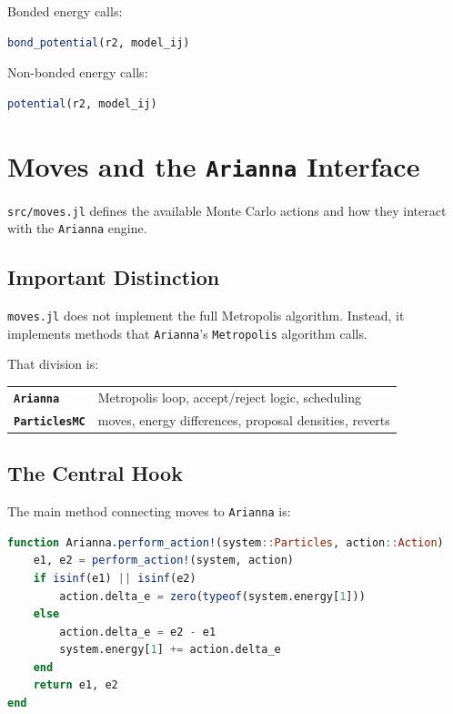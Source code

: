 \documentclass[11pt]{article}
\begin{document}
Bonded energy calls:

\begin{lstlisting}[language=Julia]
bond_potential(r2, model_ij)
\end{lstlisting}

Non-bonded energy calls:

\begin{lstlisting}[language=Julia]
potential(r2, model_ij)
\end{lstlisting}

\section{Moves and the \texttt{Arianna} Interface}

\texttt{src/moves.jl} defines the available Monte Carlo actions and how they
interact with the \texttt{Arianna} engine.

\subsection{Important Distinction}

\texttt{moves.jl} does not implement the full Metropolis algorithm. Instead, it
implements methods that \texttt{Arianna}'s \texttt{Metropolis} algorithm calls.

That division is:

\begin{center}
\begin{tabular}{ll}
\textbf{\texttt{Arianna}} & Metropolis loop, accept/reject logic, scheduling \\
\textbf{\texttt{ParticlesMC}} & moves, energy differences, proposal densities, reverts
\end{tabular}
\end{center}

\subsection{The Central Hook}

The main method connecting moves to \texttt{Arianna} is:

\begin{lstlisting}[language=Julia]
function Arianna.perform_action!(system::Particles, action::Action)
    e1, e2 = perform_action!(system, action)
    if isinf(e1) || isinf(e2)
        action.delta_e = zero(typeof(system.energy[1]))
    else
        action.delta_e = e2 - e1
        system.energy[1] += action.delta_e
    end
    return e1, e2
end
\end{lstlisting}
\end{document}
